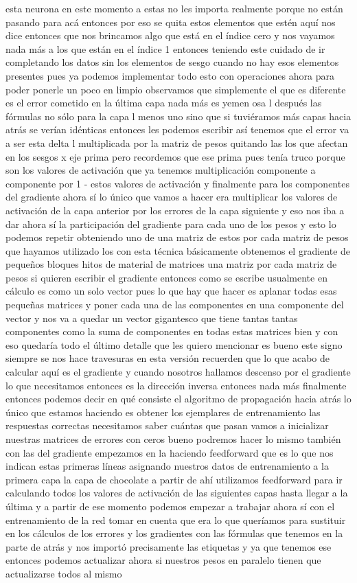 esta neurona en este momento a estas no les importa realmente porque no están pasando para acá entonces por eso se quita estos elementos que estén aquí nos dice entonces que nos brincamos algo que está en el índice cero y nos vayamos nada más a los que están en el índice 1 entonces teniendo este cuidado de ir completando los datos sin los elementos de sesgo cuando no hay esos elementos presentes pues ya podemos implementar todo esto con operaciones ahora para poder ponerle un poco en limpio observamos que simplemente el que es diferente es el error cometido en la última capa nada más es yemen osa l después las fórmulas no sólo para la capa l menos uno sino que si tuviéramos más capas hacia atrás se verían idénticas entonces les podemos escribir así tenemos que el error va a ser esta delta l multiplicada por la matriz de pesos quitando las los que afectan en los sesgos x eje prima pero recordemos que ese prima pues tenía truco porque son los valores de activación que ya tenemos multiplicación componente a componente por 1 - estos valores de activación y finalmente para los componentes del gradiente ahora sí lo único que vamos a hacer era multiplicar los valores de activación de la capa anterior por los errores de la capa siguiente y eso nos iba a dar ahora sí la participación del gradiente para cada uno de los pesos y esto lo podemos repetir obteniendo uno de una matriz de estos por cada matriz de pesos que hayamos utilizado los con esta técnica básicamente obtenemos el gradiente de pequeños bloques hitos de material de matrices una matriz por cada matriz de pesos si quieren escribir el gradiente entonces como se escribe usualmente en cálculo es como un solo vector pues lo que hay que hacer es aplanar todas esas pequeñas matrices y poner cada una de las componentes en una componente del vector y nos va a quedar un vector gigantesco que tiene tantas tantas componentes como la suma de componentes en todas estas matrices bien y con eso quedaría todo el último detalle que les quiero mencionar es bueno este signo siempre se nos hace travesuras en esta versión recuerden que lo que acabo de calcular aquí es el gradiente y cuando nosotros hallamos descenso por el gradiente lo que necesitamos entonces es la dirección inversa entonces nada más finalmente entonces podemos decir en qué consiste el algoritmo de propagación hacia atrás lo único que estamos haciendo es obtener los ejemplares de entrenamiento las respuestas correctas necesitamos saber cuántas que pasan vamos a inicializar nuestras matrices de errores con ceros bueno podremos hacer lo mismo también con las del gradiente empezamos en la haciendo feedforward que es lo que nos indican estas primeras líneas asignando nuestros datos de entrenamiento a la primera capa la capa de chocolate a partir de ahí utilizamos feedforward para ir calculando todos los valores de activación de las siguientes capas hasta llegar a la última y a partir de ese momento podemos empezar a trabajar ahora sí con el entrenamiento de la red tomar en cuenta que era lo que queríamos para sustituir en los cálculos de los errores y los gradientes con las fórmulas que tenemos en la parte de atrás y nos importó precisamente las etiquetas y ya que tenemos ese entonces podemos actualizar ahora si nuestros pesos en paralelo tienen que actualizarse todos al mismo 